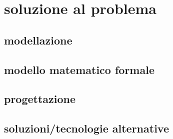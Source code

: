 \section{soluzione al problema}

\subsection{modellazione}

\subsection{modello matematico formale}

\subsection{progettazione}

\subsection{soluzioni/tecnologie alternative}